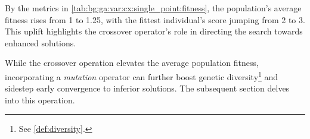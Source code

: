   By the metrics in \vref{tab:bg:ga:var:cx:single_point:fitness}, the population's average fitness rises from 1 to 1.25,
  with the fittest individual's score jumping from 2 to 3. This uplift highlights the crossover operator's role in 
  directing the search towards enhanced solutions.

  While the crossover operation elevates the average population fitness, 
  incorporating a \emph{mutation} operator can further boost genetic 
  diversity\footnote{See \vref{def:diversity}.} and sidestep early convergence
  to inferior solutions.
  The subsequent section delves into this operation.
